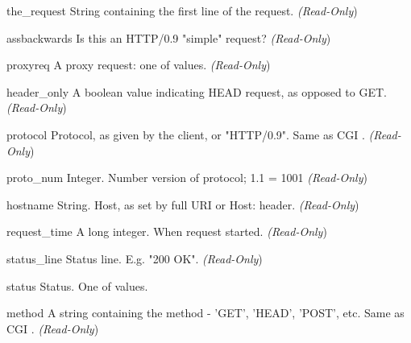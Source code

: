 \begin{memberdesc}[request]{the_request}
String containing the first line of the request.
\emph{(Read-Only})
\end{memberdesc}

\begin{memberdesc}[request]{assbackwards}
Is this an HTTP/0.9 "simple" request? 
\emph{(Read-Only})
\end{memberdesc}

\begin{memberdesc}[request]{proxyreq}
A proxy request: one of  values.
\emph{(Read-Only})
\end{memberdesc}

\begin{memberdesc}[request]{header_only}
A boolean value indicating HEAD request, as opposed to GET. 
\emph{(Read-Only})
\end{memberdesc}

\begin{memberdesc}[request]{protocol}
Protocol, as given by the client, or "HTTP/0.9". Same as CGI .
\emph{(Read-Only})
\end{memberdesc}

\begin{memberdesc}[request]{proto_num}
Integer. Number version of protocol; 1.1 = 1001 
\emph{(Read-Only})
\end{memberdesc}

\begin{memberdesc}[request]{hostname}
String. Host, as set by full URI or Host: header.
\emph{(Read-Only})
\end{memberdesc}

\begin{memberdesc}[request]{request_time}
A long integer. When request started.
\emph{(Read-Only})
\end{memberdesc}

\begin{memberdesc}[request]{status_line}
Status line. E.g. "200 OK". 
\emph{(Read-Only})
\end{memberdesc}

\begin{memberdesc}[request]{status}
Status. One of  values.
\end{memberdesc}

\begin{memberdesc}[request]{method}
A string containing the method - 'GET', 'HEAD', 'POST', etc.
Same as CGI .
\emph{(Read-Only})
\end{memberdesc}


